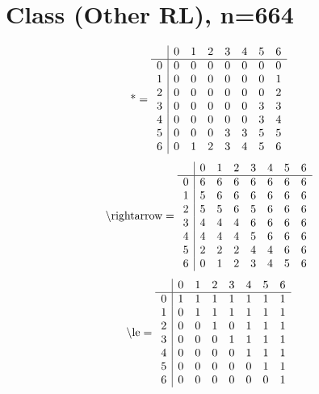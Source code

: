 \documentclass[11pt]{article}
\begin{document}
\section{Class (Other RL), n=664}
\[\text{*} = 
\begin{array}{r | r r r r r r r}
 & 0 & 1 & 2 & 3 & 4 & 5 & 6 \\ \hline
0 & 0 & 0 & 0 & 0 & 0 & 0 & 0 \\
1 & 0 & 0 & 0 & 0 & 0 & 0 & 1 \\
2 & 0 & 0 & 0 & 0 & 0 & 0 & 2 \\
3 & 0 & 0 & 0 & 0 & 0 & 3 & 3 \\
4 & 0 & 0 & 0 & 0 & 0 & 3 & 4 \\
5 & 0 & 0 & 0 & 3 & 3 & 5 & 5 \\
6 & 0 & 1 & 2 & 3 & 4 & 5 & 6 \\
\end{array}
\]
\[\text{\textbackslash rightarrow} = 
\begin{array}{r | r r r r r r r}
 & 0 & 1 & 2 & 3 & 4 & 5 & 6 \\ \hline
0 & 6 & 6 & 6 & 6 & 6 & 6 & 6 \\
1 & 5 & 6 & 6 & 6 & 6 & 6 & 6 \\
2 & 5 & 5 & 6 & 5 & 6 & 6 & 6 \\
3 & 4 & 4 & 4 & 6 & 6 & 6 & 6 \\
4 & 4 & 4 & 4 & 5 & 6 & 6 & 6 \\
5 & 2 & 2 & 2 & 4 & 4 & 6 & 6 \\
6 & 0 & 1 & 2 & 3 & 4 & 5 & 6 \\
\end{array}
\]
\[\text{\textbackslash le} = 
\begin{array}{r | r r r r r r r}
 & 0 & 1 & 2 & 3 & 4 & 5 & 6 \\ \hline
0 & 1 & 1 & 1 & 1 & 1 & 1 & 1 \\
1 & 0 & 1 & 1 & 1 & 1 & 1 & 1 \\
2 & 0 & 0 & 1 & 0 & 1 & 1 & 1 \\
3 & 0 & 0 & 0 & 1 & 1 & 1 & 1 \\
4 & 0 & 0 & 0 & 0 & 1 & 1 & 1 \\
5 & 0 & 0 & 0 & 0 & 0 & 1 & 1 \\
6 & 0 & 0 & 0 & 0 & 0 & 0 & 1 \\
\end{array}
\]
\end{document}
